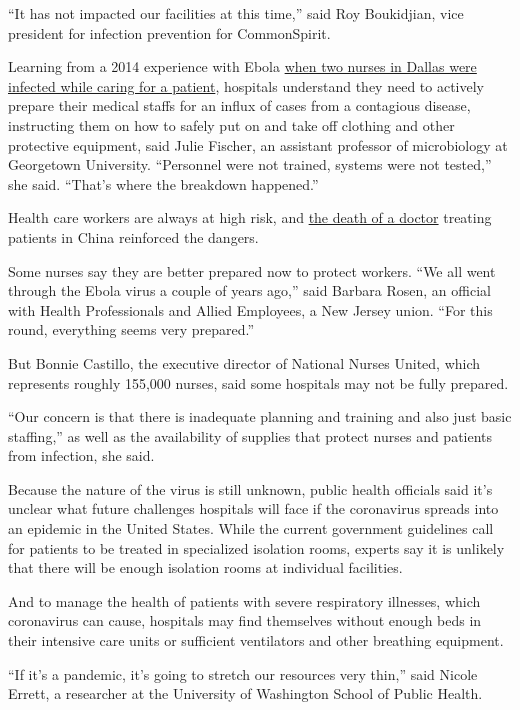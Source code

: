 ``It has not impacted our facilities at this time,'' said Roy
Boukidjian, vice president for infection prevention for CommonSpirit.

Learning from a 2014 experience with Ebola
\href{https://www.nytimes.com/2014/10/29/us/ebola-outbreak-dallas-nurse-amber-joy-vinson.html}{when
two nurses in Dallas were infected while caring for a patient},
hospitals understand they need to actively prepare their medical staffs
for an influx of cases from a contagious disease, instructing them on
how to safely put on and take off clothing and other protective
equipment, said Julie Fischer, an assistant professor of microbiology at
Georgetown University. ``Personnel were not trained, systems were not
tested,'' she said. ``That's where the breakdown happened.''

Health care workers are always at high risk, and
\href{https://www.nytimes.com/2020/02/06/world/asia/chinese-doctor-Li-Wenliang-coronavirus.html}{the
death of a doctor} treating patients in China reinforced the dangers.

Some nurses say they are better prepared now to protect workers. ``We
all went through the Ebola virus a couple of years ago,'' said Barbara
Rosen, an official with Health Professionals and Allied Employees, a New
Jersey union. ``For this round, everything seems very prepared.''

But Bonnie Castillo, the executive director of National Nurses United,
which represents roughly 155,000 nurses, said some hospitals may not be
fully prepared.

``Our concern is that there is inadequate planning and training and also
just basic staffing,'' as well as the availability of supplies that
protect nurses and patients from infection, she said.

Because the nature of the virus is still unknown, public health
officials said it's unclear what future challenges hospitals will face
if the coronavirus spreads into an epidemic in the United States. While
the current government guidelines call for patients to be treated in
specialized isolation rooms, experts say it is unlikely that there will
be enough isolation rooms at individual facilities.

And to manage the health of patients with severe respiratory illnesses,
which coronavirus can cause, hospitals may find themselves without
enough beds in their intensive care units or sufficient ventilators and
other breathing equipment.

``If it's a pandemic, it's going to stretch our resources very thin,''
said Nicole Errett, a researcher at the University of Washington School
of Public Health.

